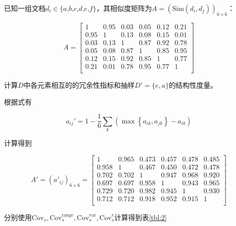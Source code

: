 \documentclass{../notes}
\newcommand{\Cov}{\text{Cov}}
\newcommand{\Sim}{\text{Sim}}
\begin{document}
    \begin{example}
        已知一组文档$d_i \in\{\textit{a,b,c,d,e,f}\}$，其相似度矩阵为$A = (\Sim(d_i, d_j))_{6\times 6}$：

        \begin{equation}
            A = \begin{bmatrix}
                1 & 0.95 & 0.03 & 0.05 & 0.12 & 0.21 \\
                0.95 & 1 & 0.13 & 0.08 & 0.15 & 0.01 \\
                0.03 & 0.13 & 1 & 0.87 & 0.92 & 0.78 \\
                0.05 & 0.08 & 0.87 & 1 & 0.85 & 0.95 \\
                0.12 & 0.15 & 0.92 & 0.85 & 1 & 0.77 \\
                0.21 & 0.01 & 0.78 & 0.95 & 0.77 & 1 \\
            \end{bmatrix}
        \end{equation}

        计算$D$中各元素相互的的冗余性指标和抽样$D' = \{e, a\}$的结构性度量。
    \end{example}

    根据式有

    \begin{equation}
        a_{ij}' = 1-\frac{1}{6}\sum_{k}\left(\max\left\{a_{ik},a_{jk}\right\}-a_{ik}\right)
    \end{equation}

    计算得到

    \begin{equation}
        A' = \left(a'_{ij}\right)_{6\times 6} = \begin{bmatrix}
            1 & 0.965 & 0.473 & 0.457 & 0.478 & 0.485 \\
            0.958 & 1 & 0.467 & 0.450 & 0.472 & 0.478 \\
            0.702 & 0.702 & 1 & 0.947 & 0.968 & 0.920 \\
            0.697 & 0.697 & 0.958 & 1 & 0.943 & 0.965 \\
            0.729 & 0.720 & 0.982 & 0.945 & 1 & 0.930 \\
            0.712 & 0.712 & 0.918 & 0.952 & 0.915 & 1 \\
        \end{bmatrix}
    \end{equation}

    分别使用$\Cov_s, \Cov_s^{\text{range}}, \Cov_s^{\text{var}}, \Cov_s^r$计算得到表\ref{tbl:2}
\end{document}
